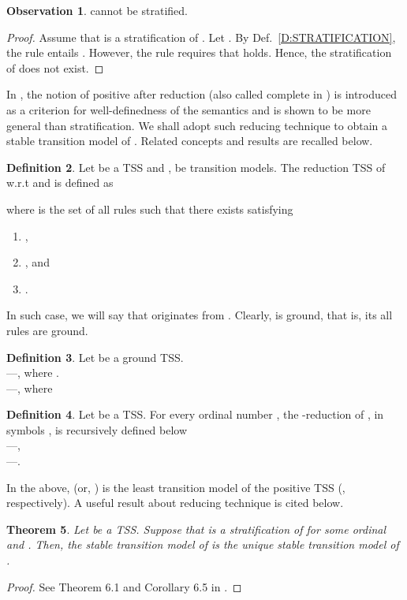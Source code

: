 \documentclass{elsarticle}
\theoremstyle{plain}
\newtheorem{theorem}{Theorem}[section]
\theoremstyle{definition}
\newtheorem{mydefn}[theorem]{Definition}
\newtheorem{observation}[theorem]{Observation}
\begin{document}
\begin{observation}
  cannot be stratified.
\end{observation}
\begin{proof}
    Assume that  is a stratification of . Let . By Def.~\ref{D:STRATIFICATION}, the rule  entails . However, the rule  requires that  holds. Hence, the stratification of  does not exist.
\end{proof}

In \cite{Bol96}, the notion of positive after reduction (also called complete in \cite{Glabbeek04}) is introduced as a criterion for well-definedness of the semantics and is shown to be more general than stratification.
We shall adopt such reducing technique to obtain a stable transition model of .
Related concepts and results are recalled below.

\begin{mydefn}\label{D:REDUCTION}
    Let  be a TSS and ,  be transition models. The reduction TSS of  w.r.t  and  is defined as
    
    where  is the set of all rules  such that there exists  satisfying
    \begin{enumerate}
      \item ,
      \item , and
      \item .
    \end{enumerate}
    In such case, we will say that  originates from . Clearly,
     is ground, that is, its all rules are ground.
\end{mydefn}


\begin{mydefn}
    Let  be a ground TSS.\\
    ---, where .\\
    ---, where
    
\end{mydefn}

\begin{mydefn}
    Let  be a TSS. For every ordinal number , the -reduction of , in symbols , is recursively defined below\\
    ---, \\
    ---.
\end{mydefn}
In the above,  (or, ) is the least transition
    model of the positive TSS  (, respectively).
A useful result about reducing technique is cited below.

\begin{theorem}\label{C:stable}
    Let  be a TSS. Suppose that  is a stratification of  for some ordinal  and . Then, the stable transition model of  is the unique stable transition model of .
\end{theorem}
\begin{proof}
  See Theorem 6.1 and Corollary 6.5 in \cite{Bol96}.
\end{proof}
\end{document}
